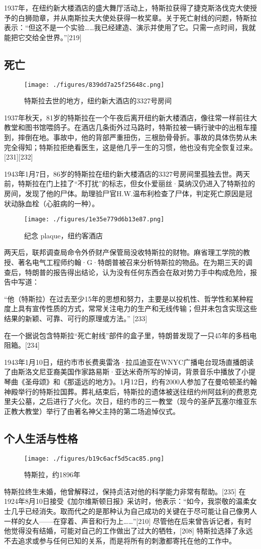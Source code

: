 1937年，在纽约新大楼酒店的盛大舞厅活动上，特斯拉获得了捷克斯洛伐克大使授予的白狮勋章，并从南斯拉夫大使处获得一枚奖章。关于死亡射线的问题，特斯拉表示：“但这不是一个实验……我已经建造、演示并使用了它。只需一点时间，我就能把它交给全世界。”[219]
\subsection{死亡}
\begin{figure}[ht]
\centering
\texttt{[image: ./figures/839dd7a25f25648c.png]}
\caption{特斯拉去世的地方，纽约新大酒店的3327号房间} \label{fig_Tesla_22}
\end{figure}
1937年秋天，81岁的特斯拉在一个午夜后离开纽约新大楼酒店，像往常一样前往大教堂和图书馆喂鸽子。在酒店几条街外过马路时，特斯拉被一辆行驶中的出租车撞到，摔倒在地。事故中，他的背部严重扭伤，三根肋骨骨折。事故的具体伤势从未完全得知；特斯拉拒绝看医生，这是他几乎一生的习惯，他也没有完全恢复过来。[231][232]

1943年1月7日，86岁的特斯拉在纽约新大楼酒店的3327号房间里孤独去世。两天前，特斯拉在门上挂了“不打扰”的标志，但女仆爱丽丝·莫纳汉仍进入了特斯拉的房间，发现了他的尸体。助理验尸官H.W.温布利检查了尸体，判定死亡原因是冠状动脉血栓（心脏病的一种）。
\begin{figure}[ht]
\centering
\texttt{[image: ./figures/1e35e779d6b13e87.png]}
\caption{纪念 plaque，纽约客酒店} \label{fig_Tesla_21}
\end{figure}
两天后，联邦调查局命令外侨财产保管局没收特斯拉的财物。麻省理工学院的教授、著名电气工程师约翰·G·特朗普被召来分析特斯拉的物品。在为期三天的调查后，特朗普的报告得出结论，认为没有任何东西会在敌对势力手中构成危险，报告中写道：

“他（特斯拉）在过去至少15年的思想和努力，主要是以投机性、哲学性和某种程度上具有宣传性质的方式，常常关注电力的生产和无线传输；但并未包含实现这些结果的新颖、可靠、可行的原理或方法。” [233]

在一个据说包含特斯拉“死亡射线”部件的盒子里，特朗普发现了一只45年的多档电阻箱。[234]

1943年1月10日，纽约市市长费奥雷洛·拉瓜迪亚在WNYC广播电台现场直播朗读了由斯洛文尼亚裔美国作家路易斯·亚达米奇所写的悼词，背景音乐中播放了小提琴曲《圣母颂》和《那遥远的地方》。1月12日，约有2000人参加了在曼哈顿圣约翰神殿举行的特斯拉国葬。葬礼结束后，特斯拉的遗体被送往纽约州阿兹利的费恩克里夫公墓，之后进行了火化。次日，纽约市的三一教堂（现今的圣萨瓦塞尔维亚东正教大教堂）举行了由著名神父主持的第二场追悼仪式。
\subsection{个人生活与性格}
\begin{figure}[ht]
\centering
\texttt{[image: ./figures/b19c6acf5d5cac85.png]}
\caption{特斯拉，约1896年} \label{fig_Tesla_23}
\end{figure}
特斯拉终生未婚，他曾解释过，保持贞洁对他的科学能力非常有帮助。[235] 在1924年8月10日接受《加尔维斯顿日报》采访时，他表示：“如今，我崇敬的温柔女士几乎已经消失。取而代之的是那种认为自己成功的关键在于尽可能让自己像男人一样的女人——在穿着、声音和行为上……”[210] 尽管他在后来曾告诉记者，有时他觉得没有结婚，可能对自己的工作做出了过大的牺牲，[208] 特斯拉选择了永远不去追求或参与任何已知的关系，而是将所有的刺激都寄托在他的工作中。

